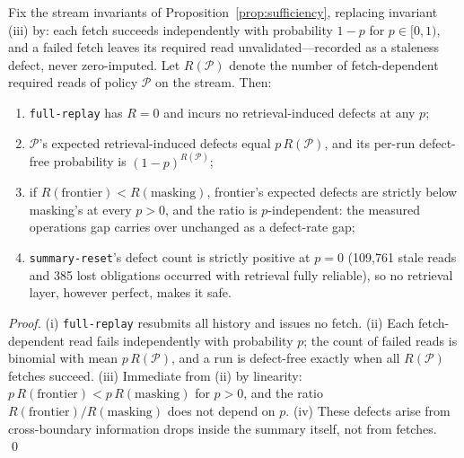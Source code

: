 \begin{proposition}\label{prop:pfail}
Fix the stream invariants of Proposition~\ref{prop:sufficiency},
replacing invariant (iii) by: each fetch succeeds independently with
probability $1-p$ for $p\in[0,1)$, and a failed fetch leaves its
required read unvalidated---recorded as a staleness defect, never
zero-imputed. Let $R(\mathcal P)$ denote the number of fetch-dependent
required reads of policy $\mathcal P$ on the stream. Then:
\begin{enumerate}[leftmargin=*,itemsep=0pt]
\item[(i)] \texttt{full-replay} has $R=0$ and incurs no
retrieval-induced defects at any $p$;
\item[(ii)] $\mathcal P$'s expected retrieval-induced defects equal
$p\,R(\mathcal P)$, and its per-run defect-free probability is
$(1-p)^{R(\mathcal P)}$;
\item[(iii)] if $R(\text{frontier})<R(\text{masking})$, frontier's
expected defects are strictly below masking's at every $p>0$, and the
ratio is $p$-independent: the measured operations gap carries over
unchanged as a defect-rate gap;
\item[(iv)] \texttt{summary-reset}'s defect count is strictly positive
at $p=0$ (109{,}761 stale reads and 385 lost obligations occurred with
retrieval fully reliable), so no retrieval layer, however perfect,
makes it safe.
\end{enumerate}
\end{proposition}
\begin{proof}
(i) \texttt{full-replay} resubmits all history and issues no fetch.
(ii) Each fetch-dependent read fails independently with probability
$p$; the count of failed reads is binomial with mean $p\,R(\mathcal P)$,
and a run is defect-free exactly when all $R(\mathcal P)$ fetches
succeed. (iii) Immediate from (ii) by linearity:
$p\,R(\text{frontier})<p\,R(\text{masking})$ for $p>0$, and the ratio
$R(\text{frontier})/R(\text{masking})$ does not depend on $p$.
(iv) These defects arise from cross-boundary information drops inside
the summary itself, not from fetches. \qed
\end{proof}

